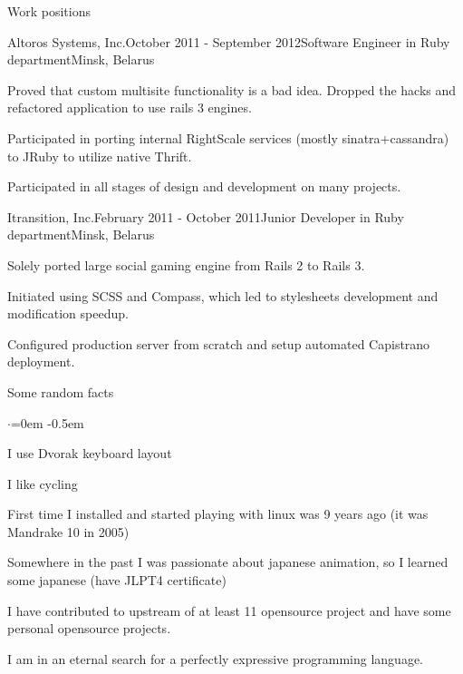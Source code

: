 \documentclass{resume} %
\begin{document}
\begin{rSection}{Work positions}
\begin{rSubsection}{Altoros Systems, Inc.}{October 2011 - September 2012}{Software Engineer in Ruby department}{Minsk, Belarus}
\item Proved that custom multisite functionality is a bad idea. Dropped the hacks and refactored application to use rails 3 engines.
\item Participated in porting internal RightScale services (mostly sinatra+cassandra) to JRuby to utilize native Thrift.
\item Participated in all stages of design and development on many projects.
\end{rSubsection}

\begin{rSubsection}{Itransition, Inc.}{February 2011 - October 2011}{Junior Developer in Ruby department}{Minsk, Belarus}
\item Solely ported large social gaming engine from Rails 2 to Rails 3.
\item Initiated using SCSS and Compass, which led to stylesheets development and modification speedup.
\item Configured production server from scratch and setup automated Capistrano deployment.
\end{rSubsection}

\end{rSection}


\begin{rSection}{Some random facts}
  \smallskip
  \begin{list}{$\cdot$}{\leftmargin=0em} %
    \itemsep -0.5em \vspace{-0.5em} %
  \item I use Dvorak keyboard layout
  \item I like cycling
  \item First time I installed and started playing with linux was 9 years ago (it was
    Mandrake 10 in 2005)
  \item Somewhere in the past I was passionate about japanese animation, so I learned
    some japanese (have JLPT4 certificate)
  \item I have contributed to upstream of at least 11 opensource project
      and have some personal opensource projects.
  \item I am in an eternal search for a perfectly expressive programming language.
  \end{list}
\end{rSection}

\end{document}
